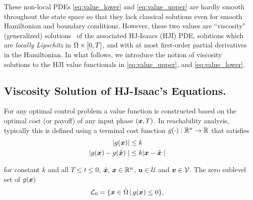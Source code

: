 These non-local PDEs \ie \eqref{eq:value_lower} and \eqref{eq:value_upper} are hardly smooth throughout the state space so that they  lack classical solutions even for smooth Hamiltonian and boundary conditions. However, these two values are ``viscosity" (generalized)  solutions~\cite{Lions1982, Crandall1983viscosity} of the associated HJ-Isaacs (HJI) PDE, \ie solutions which are \textit{locally Lipschitz} in $\Omega \times [0, T]$, and with at most first-order partial derivatives in the Hamiltonian. In what follows, we introduce the notion of viscosity solutions to the HJI value functionals in \eqref{eq:value_upper}, and \eqref{eq:value_lower}.


\subsection{Viscosity Solution of HJ-Isaac's Equations.}
\label{subsec:visc}

\noindent  
For any optimal control problem a value function is constructed based on the optimal cost (or payoff) of any input phase $(\bm{x}, T)$.  In reachability analysis, typically this is defined using a terminal cost function $g(\cdot): \mathbb{R}^n \rightarrow \mathbb{R}$ that satisfies 
\begin{subequations}
	\begin{align}
		| g(\bm{x}) | &\le k \\
		| g(\bm{x}) - g(\hat{\bm{x}}) \mid &\le k | \bm{x} - \hat{\bm{x}} \mid
	\end{align}
\end{subequations}

for constant $k$ and all 
$T \le t \le 0$, $\hat{\bm{x}}, \, \bm{x} \in \mathbb{R}^n$, $\bm{u}\in \mathcal{U}$ and $\bm{v} \in \mathcal{V}$.  The zero sublevel set of $g(\bm{x})$ \ie
%
\begin{align}
	\mathcal{L}_0 = \{ \state \in \bar{\Omega} \,|\, g(\state) \le 0 \},
	\label{eq:target_set_syk}
\end{align}

